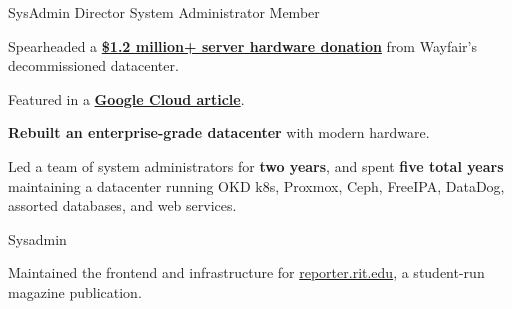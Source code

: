 \vspace{1.5pt} %


\cvtag{\LaTeX}

\smallskip


{
  {SysAdmin Director}    \hfill{}\newline
  {System Administrator} \hfill{}\newline
  {Member}               \hfill{}\newline
}
{
  \item{Spearheaded a \href{https://www.rit.edu/news/wayfair-gifts-850000-servers-rits-computer-science-house}{\textbf{\$1.2 million+ server hardware donation}} from Wayfair's decommissioned datacenter.}
  \item{Featured in a \href{https://cloud.google.com/blog/transform/wayfair-server-donation-mass-open-cloud-rit-student-innovation-johonnot}{\textbf{Google Cloud article}}.}
  \item{\textbf{Rebuilt an enterprise-grade datacenter} with modern hardware.}
  \item{Led a team of system administrators for \textbf{two years}, and spent \textbf{five total years} maintaining a datacenter running OKD k8s, Proxmox, Ceph, FreeIPA, DataDog, assorted databases, and web services.}
}

{
  {Sysadmin} \hfill{}\newline
}
{
  \item{Maintained the frontend and infrastructure for \href{https://reporter.rit.edu}{reporter.rit.edu}, a student-run magazine publication.}
}

